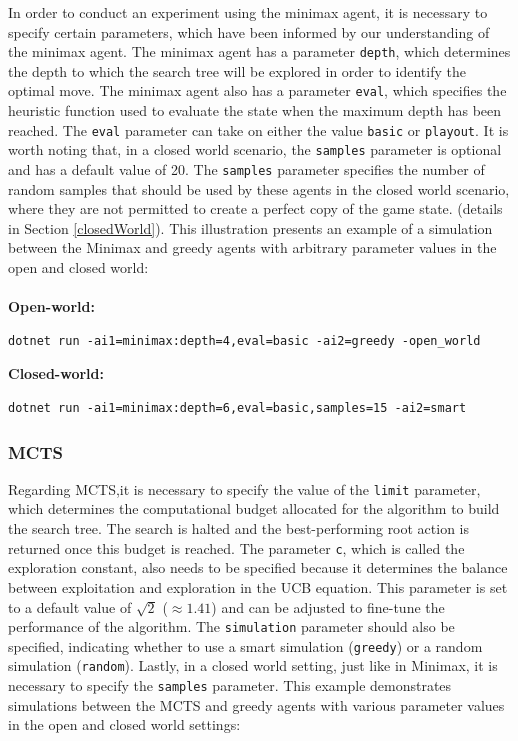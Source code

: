 In order to conduct an experiment using the minimax agent, it is necessary to specify certain parameters, which have been informed by our understanding of the minimax agent. The minimax agent has a parameter \texttt{depth}, which determines the depth to which the search tree will be explored in order to identify the optimal move. The minimax agent also has a parameter \texttt{eval}, which specifies the heuristic function used to evaluate the state when the maximum depth has been reached. The \texttt{eval} parameter can take on either the value \texttt{basic} or \texttt{playout}. It is worth noting that, in a closed world scenario, the \texttt{samples} parameter is optional and has a default value of 20. The \texttt{samples} parameter specifies the number of random samples that should be used by these agents in the closed world scenario, where they are not permitted to create a perfect copy of the game state.  (details in Section \ref{closedWorld}). This illustration presents an example of a simulation between the Minimax and greedy agents with arbitrary parameter values in the open and closed world:\\\\

\textbf{Open-world: }
\begin{lstlisting}
dotnet run -ai1=minimax:depth=4,eval=basic -ai2=greedy -open_world
\end{lstlisting}

\textbf{Closed-world: }
\begin{lstlisting}
dotnet run -ai1=minimax:depth=6,eval=basic,samples=15 -ai2=smart
\end{lstlisting}

\subsubsection{MCTS}

Regarding MCTS,it is necessary to specify the value of the \texttt{limit} parameter, which determines the computational budget allocated for the algorithm to build the search tree. The search is halted and the best-performing root action is returned once this budget is reached. The parameter \texttt{c}, which is called the exploration constant, also needs to be specified because it determines the balance between exploitation and exploration in the UCB equation. This parameter is set to a default value of  $\sqrt{2}$ ($\approx 1.41$) and can be adjusted to fine-tune the performance of the algorithm. The \texttt{simulation} parameter should also be specified, indicating whether to use a smart simulation (\texttt{greedy}) or a random simulation (\texttt{random}). Lastly, in a closed world setting, just like in Minimax, it is necessary to specify the \texttt{samples} parameter. This example demonstrates simulations between the MCTS and greedy agents with various parameter values in the open and closed world settings: \\\\

